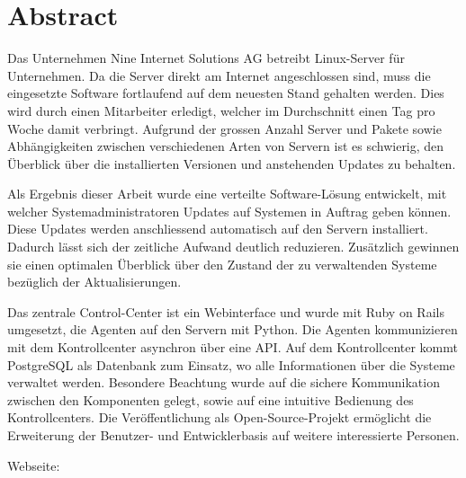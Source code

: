 \begin{comment}
2.1.2 Abstract
Ein Abstract ist eine rein textuelle kurze Zusammenfassung der Arbeit. Der Abstract ist für die Recherche in grossen Dokumentensammlungen geeignet. Er umfasst nie mehr als eine Seite, typisch sogar nur etwa 200 Worte (etwa 20 Zeilen).
Der Begriff ‚Kurzfassung’ ist zuwenig genau definiert; er soll wenn möglich vermieden werden.


“Der Abstract richtet sich an den Spezialisten auf dem entsprechenden Gebiet und beschreibt daher in erster Linie die (neuen, eigenen) Ergebnisse und Resultate der Arbeit. Es umfasst nie mehr als eine Seite, typisch sogar nur etwa 200 Worte (etwa 20 Zeilen). Es sind keine Bilder zu verwenden.” (Anleitung: Dokumentation Studien- und Bachelorarbeiten)

Offene Fragen:
- Mehr zur Umsetzung?
- Nutzen für den obigen Mitarbeiter? Zeitersparnis, Überblick?

\end{comment}

{}
\chapter*{Abstract}

Das Unternehmen Nine Internet Solutions AG betreibt Linux-Server für Unternehmen. Da die Server direkt am Internet angeschlossen sind, muss die eingesetzte Software fortlaufend auf dem neuesten Stand gehalten werden. Dies wird durch einen Mitarbeiter erledigt, welcher im Durchschnitt einen Tag pro Woche damit verbringt. Aufgrund der grossen Anzahl Server und Pakete sowie Abhängigkeiten zwischen verschiedenen Arten von Servern ist es schwierig, den Überblick über die installierten Versionen und anstehenden Updates zu behalten.

Als Ergebnis dieser Arbeit wurde eine verteilte Software-Lösung entwickelt, mit welcher Systemadministratoren Updates auf Systemen in Auftrag geben können. Diese Updates werden anschliessend automatisch auf den Servern installiert. Dadurch lässt sich der zeitliche Aufwand deutlich reduzieren. Zusätzlich gewinnen sie einen optimalen Überblick über den Zustand der zu verwaltenden Systeme bezüglich der Aktualisierungen.

Das zentrale Control-Center ist ein Webinterface und wurde mit Ruby on Rails umgesetzt, die Agenten auf den Servern mit Python. Die Agenten kommunizieren mit dem Kontrollcenter asynchron über eine API. Auf dem Kontrollcenter kommt PostgreSQL als Datenbank zum Einsatz, wo alle Informationen über die Systeme verwaltet werden. Besondere Beachtung wurde auf die sichere Kommunikation zwischen den Komponenten gelegt, sowie auf eine intuitive Bedienung des Kontrollcenters. Die Veröffentlichung als Open-Source-Projekt ermöglicht die Erweiterung der Benutzer- und Entwicklerbasis auf weitere interessierte Personen.


\bigskip
Webseite: 

\glsresetall

